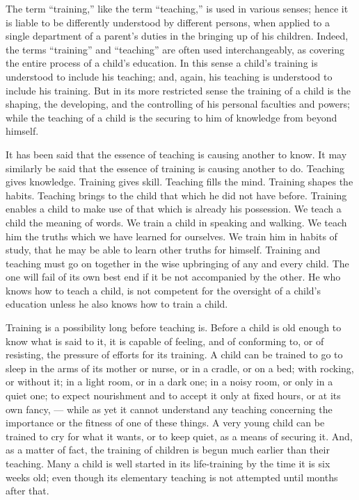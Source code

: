 \documentclass[
]{book}
\begin{document}
The term ``training,'' like the term ``teaching,'' is used in various senses; hence it is liable to be differently understood by different persons, when applied to a single department of a parent's duties in the bringing up of his children. Indeed, the terms ``training'' and ``teaching'' are often used interchangeably, as covering the entire process of a child's education. In this sense a child's training is understood to include his teaching; and, again, his teaching is understood to include his training. But in its more restricted sense the training of a child is the shaping, the developing, and the controlling of his personal faculties and powers; while the teaching of a child is the securing to him of knowledge from beyond himself.

It has been said that the essence of teaching is causing another to know. It may similarly be said that the essence of training is causing another to do. Teaching gives knowledge. Training gives skill. Teaching fills the mind. Training shapes the habits. Teaching brings to the child that which he did not have before. Training enables a child to make use of that which is already his possession. We teach a child the meaning of words. We train a child in speaking and walking. We teach him the truths which we have learned for ourselves. We train him in habits of study, that he may be able to learn other truths for himself. Training and teaching must go on together in the wise upbringing of any and every child. The one will fail of its own best end if it be not accompanied by the other. He who knows how to teach a child, is not competent for the oversight of a child's education unless he also knows how to train a child.

Training is a possibility long before teaching is. Before a child is old enough to know what is said to it, it is capable of feeling, and of conforming to, or of resisting, the pressure of efforts for its training. A child can be trained to go to sleep in the arms of its mother or nurse, or in a cradle, or on a bed; with rocking, or without it; in a light room, or in a dark one; in a noisy room, or only in a quiet one; to expect nourishment and to accept it only at fixed hours, or at its own fancy, --- while as yet it cannot understand any teaching concerning the importance or the fitness of one of these things. A very young child can be trained to cry for what it wants, or to keep quiet, as a means of securing it. And, as a matter of fact, the training of children is begun much earlier than their teaching. Many a child is well started in its life-training by the time it is six weeks old; even though its elementary teaching is not attempted until months after that.
\end{document}
